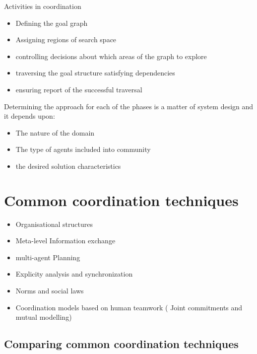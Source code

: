 Activities in coordination
\begin{itemize}
\item Defining the goal graph
\item Assigning regions of search space
\item controlling decisions about which areas of the graph to explore
\item traversing the goal structure satisfying dependencies
\item ensuring report of the successful traversal
\end{itemize}
Determining the approach for each of the phases is a matter of system design and it depends upon:
\begin{itemize}
\item The nature of the domain
\item The type of agents included into community
\item the desired solution characteristics
\end{itemize}










\section{Common coordination techniques}

\begin{itemize}
\item Organisational structures
\item Meta-level Information exchange
\item multi-agent Planning
\item Explicity analysis and synchronization
\item Norms and social laws
\item Coordination models based on human teamwork ( Joint commitments and mutual modelling)
\end{itemize}

\subsection{Comparing common coordination techniques}

